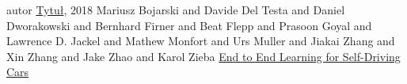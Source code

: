  autor \href{https://example.com}{Tytuł}, 2018
 Mariusz Bojarski and
               Davide Del Testa and
               Daniel Dworakowski and
               Bernhard Firner and
               Beat Flepp and
               Prasoon Goyal and
               Lawrence D. Jackel and
               Mathew Monfort and
               Urs Muller and
               Jiakai Zhang and
               Xin Zhang and
               Jake Zhao and
               Karol Zieba \href{https://arxiv.org/abs/1604.07316}{End to End Learning for Self-Driving Cars}

